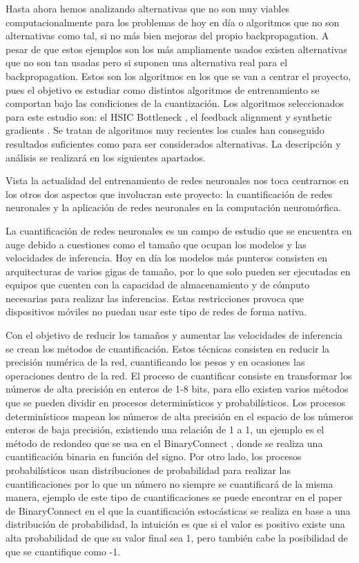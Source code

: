 Hasta ahora hemos analizando alternativas que no son muy viables computacionalmente para los problemas de hoy en día o algoritmos que no son alternativas como tal, si no más bien mejoras del propio backpropagation. A pesar de que estos ejemplos son los más ampliamente usados existen alternativas que no son tan usadas pero si suponen una alternativa real para el backpropagation. Estos son los algoritmos en los que se van a centrar el proyecto, pues el objetivo es estudiar como distintos algoritmos de entrenamiento se comportan bajo las condiciones de la cuantización. Los algoritmos seleccionados para este estudio son:  el HSIC Bottleneck \cite{ma2020hsic}, el feedback alignment \cite{RefWorks:RefID:9-lillicrap2016random} y synthetic gradients \cite{jaderberg2017decoupled}. Se tratan de algoritmos muy recientes los cuales han conseguido resultados suficientes como para ser considerados alternativas. La descripción y análisis se realizará en los siguientes apartados.  

Vista la actualidad del entrenamiento de redes neuronales nos toca centrarnos en los otros dos aspectos que involucran este proyecto: la cuantificación de redes neuronales y la aplicación de redes neuronales en la computación neuromórfica.

La cuantificación de redes neuronales es un campo de estudio que se encuentra en auge debido a cuestiones como el tamaño que ocupan los modelos y las velocidades de inferencia. Hoy en día los modelos más punteros consisten en arquitecturas de varios gigas de tamaño, por lo que solo pueden ser ejecutadas en equipos que cuenten con la capacidad de almacenamiento y de cómputo necesarias para realizar las inferencias. Estas restricciones provoca que dispositivos móviles no puedan usar este tipo de redes de forma nativa. 

Con el objetivo de reducir los tamaños y aumentar las velocidades de inferencia se crean los métodos de cuantificación. Estos técnicas consisten en reducir la precisión numérica de la red, cuantificando los pesos y en ocasiones las operaciones dentro de la red. El proceso de cuantificar consiste en transformar los números de alta precisión en enteros de 1-8 bits, para ello existen varios métodos que se pueden dividir en procesos determinísticos y probabilísticos. Los procesos determinísticos mapean los números de alta precisión en el espacio de los números enteros de baja precisión, existiendo una relación de 1 a 1, un ejemplo es el método de redondeo que se usa en el BinaryConnect \cite{10.5555/2969442.2969588}, donde se realiza una cuantificación binaria en función del signo. Por otro lado, los procesos probabilísticos usan distribuciones de probabilidad para realizar las cuantificaciones por lo que un número no siempre se cuantificará de la misma manera, ejemplo de este tipo de cuantificaciones se puede encontrar en el paper de BinaryConnect en el que la cuantificación estocásticas se realiza en base a una distribución de probabilidad, la intuición es que si el valor es positivo existe una alta probabilidad de que su valor final sea 1, pero también cabe la posibilidad de que se cuantifique como -1. 

